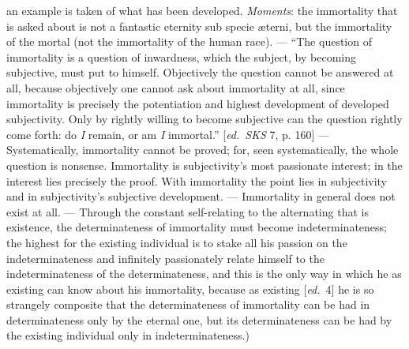 \documentclass[12pt,a4paper,openany]{book}
\newcommand{\kpage}[1]{\marginnote{\footnotesize\textit{[#1]}}}
\newcommand{\ed}[1]{{\small[\textit{ed.}\ #1]}}
\begin{document}
an example is taken of what has been developed. \emph{Moments}: the immortality
that is asked about is not a fantastic eternity sub specie
\kpage{126}æterni, but the immortality of the mortal (not the immortality of the
human race). --- ``The question of immortality is a question of inwardness,
which the subject, by becoming subjective, must put to
himself. Objectively the question cannot be answered at all, because objectively
one cannot ask about immortality at all, since immortality
is precisely the potentiation and highest development of developed subjectivity.
Only by rightly willing to become subjective can the
question rightly come forth: do \emph{I} remain, or am \emph{I} immortal.''
\ed{\emph{SKS} 7, p. 160} --- Systematically, immortality cannot be proved;
for, seen systematically, the whole question is nonsense. Immortality
is subjectivity's most passionate interest; in the interest
lies precisely the proof. With immortality the point lies in subjectivity
and in subjectivity's subjective development. --- Immortality
in general does not exist at all. --- Through the constant self-relating
to the alternating that is existence, the determinateness of immortality must
become indeterminateness; the highest for the existing individual is to
stake all his passion on the indeterminateness and infinitely passionately
relate himself to the indeterminateness of the determinateness, and this is the
only way in which he as existing can know
about his immortality, because as existing \ed{4} he is so strangely
composite that the determinateness of immortality can be had in determinateness
only by the eternal one, but its determinateness can be had by the existing individual only
in indeterminateness.)
\end{document}
